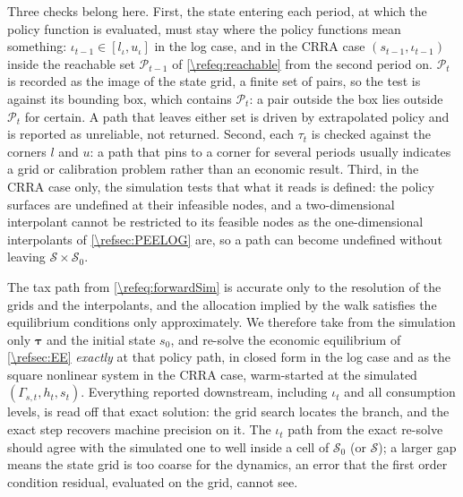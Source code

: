 Three checks belong here. First, the state entering each period, at which the policy function is evaluated, must stay where the policy functions mean something: $\iota_{t-1}\in[l_{\iota},u_{\iota}]$ in the log case, and in the CRRA case $(s_{t-1},\iota_{t-1})$ inside the reachable set $\mathcal{P}_{t-1}$ of \eqref{\refeq:reachable} from the second period on. $\mathcal{P}_t$ is recorded as the image of the state grid, a finite set of pairs, so the test is against its bounding box, which contains $\mathcal{P}_t$: a pair outside the box lies outside $\mathcal{P}_t$ for certain. A path that leaves either set is driven by extrapolated policy and is reported as unreliable, not returned. Second, each $\tau_t$ is checked against the corners $l$ and $u$: a path that pins to a corner for several periods usually indicates a grid or calibration problem rather than an economic result. Third, in the CRRA case only, the simulation tests that what it reads is defined: the policy surfaces are undefined at their infeasible nodes, and a two-dimensional interpolant cannot be restricted to its feasible nodes as the one-dimensional interpolants of \cref{\refsec:PEELOG} are, so a path can become undefined without leaving $\mathcal{S}\times\mathcal{S}_0$.

The tax path from \eqref{\refeq:forwardSim} is accurate only to the resolution of the grids and the interpolants, and the allocation implied by the walk satisfies the equilibrium conditions only approximately. We therefore take from the simulation only $\bm{\tau}$ and the initial state $s_0$, and re-solve the economic equilibrium of \cref{\refsec:EE} \emph{exactly} at that policy path, in closed form in the log case and as the square nonlinear system in the CRRA case, warm-started at the simulated $\left(\Gamma_{s,t},h_t,s_t\right)$. Everything reported downstream, including $\iota_t$ and all consumption levels, is read off that exact solution: the grid search locates the branch, and the exact step recovers machine precision on it. The $\iota_t$ path from the exact re-solve should agree with the simulated one to well inside a cell of $\mathcal{S}_0$ (or $\mathcal{S}$); a larger gap means the state grid is too coarse for the dynamics, an error that the first order condition residual, evaluated on the grid, cannot see.
